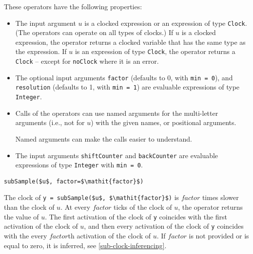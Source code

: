 These operators have the following properties:
\begin{itemize}
\item
  The input argument $u$ is a clocked expression or an expression of type \lstinline!Clock!.
  (The operators can operate on all types of clocks.)
  If $u$ is a clocked expression, the operator returns a clocked variable that has the same type as the expression.
  If $u$ is an expression of type \lstinline!Clock!, the operator returns a \lstinline!Clock! -- except for \lstinline!noClock! where it is an error.
\item
  The optional input arguments \lstinline!factor! (defaults to 0, with \lstinline!min = 0!), and \lstinline!resolution! (defaults to 1, with \lstinline!min = 1!) are evaluable expressions of type \lstinline!Integer!.
\item
  Calls of the operators can use named arguments for the multi-letter arguments (i.e., not for $u$) with the given names, or positional arguments.
\begin{nonnormative}
Named arguments can make the calls easier to understand.
\end{nonnormative}
\item
  The input arguments \lstinline!shiftCounter! and \lstinline!backCounter! are evaluable expressions of type \lstinline!Integer! with \lstinline!min = 0!.
\end{itemize}

\begin{operatordefinition}[subSample]
\begin{synopsis}\begin{lstlisting}
subSample($u$, factor=$\mathit{factor}$)
\end{lstlisting}\end{synopsis}
\begin{semantics}
The clock of \lstinline!y = subSample($u$, $\mathit{factor}$)! is $\mathit{factor}$ times slower than the clock of $u$.
At every $\mathit{factor}$ ticks of the clock of $u$, the operator returns the value of $u$.
The first activation of the clock of \lstinline!y! coincides with the first activation of the clock of $u$, and then every activation of the clock of \lstinline!y! coincides with the every $\mathit{factor}$th activation of the clock of $u$.
If $\mathit{factor}$ is not provided or is equal to zero, it is inferred, see \cref{sub-clock-inferencing}.
\end{semantics}
\end{operatordefinition}

